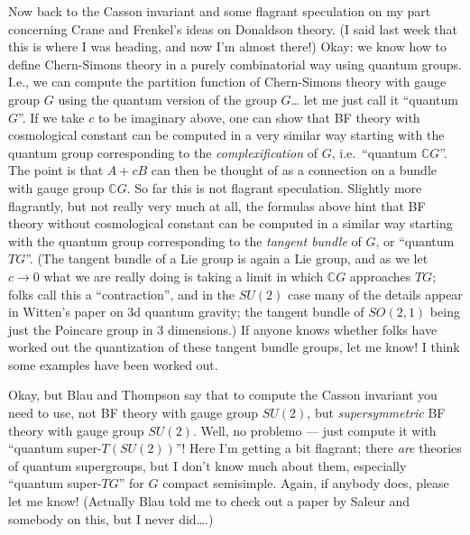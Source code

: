 \documentclass{article}
\begin{document}
Now back to the Casson invariant and some flagrant speculation on my
part concerning Crane and Frenkel's ideas on Donaldson theory. (I said
last week that this is where I was heading, and now I'm almost there!)
Okay: we know how to define Chern-Simons theory in a purely
combinatorial way using quantum groups. I.e., we can compute the
partition function of Chern-Simons theory with gauge group \(G\) using
the quantum version of the group \(G\)\ldots{} let me just call it
``quantum \(G\)''. If we take \(c\) to be imaginary above, one can show
that BF theory with cosmological constant can be computed in a very
similar way starting with the quantum group corresponding to the
\emph{complexification} of \(G\), i.e.~``quantum \(\mathbb{C}G\)''. The
point is that \(A+cB\) can then be thought of as a connection on a
bundle with gauge group \(\mathbb{C}G\). So far this is not flagrant
speculation. Slightly more flagrantly, but not really very much at all,
the formulas above hint that BF theory without cosmological constant can
be computed in a similar way starting with the quantum group
corresponding to the \emph{tangent bundle} of \(G\), or ``quantum
\(TG\)''. (The tangent bundle of a Lie group is again a Lie group, and
as we let \(c \to 0\) what we are really doing is taking a limit in
which \(\mathbb{C}G\) approaches \(TG\); folks call this a
``contraction'', and in the \(SU(2)\) case many of the details appear in
Witten's paper on 3d quantum gravity; the tangent bundle of \(SO(2,1)\)
being just the Poincare group in 3 dimensions.) If anyone knows whether
folks have worked out the quantization of these tangent bundle groups,
let me know! I think some examples have been worked out.

Okay, but Blau and Thompson say that to compute the Casson invariant you
need to use, not BF theory with gauge group \(SU(2)\), but
\emph{supersymmetric} BF theory with gauge group \(SU(2)\). Well, no
problemo --- just compute it with ``quantum super-\(T(SU(2))\)''! Here
I'm getting a bit flagrant; there \emph{are} theories of quantum
supergroups, but I don't know much about them, especially ``quantum
super-\(TG\)'' for \(G\) compact semisimple. Again, if anybody does,
please let me know! (Actually Blau told me to check out a paper by
Saleur and somebody on this, but I never did\ldots.)
\end{document}
